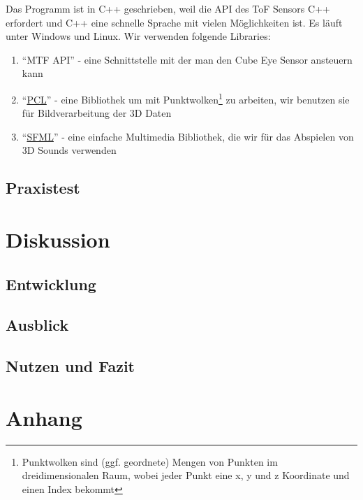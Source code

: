 \documentclass[a4paper,12pt,ngerman]{scrartcl}
\begin{document}
Das Programm ist in C++ geschrieben, weil die API des ToF Sensors C++ erfordert und C++ eine schnelle
Sprache mit vielen Möglichkeiten ist. Es läuft unter Windows und Linux. Wir verwenden folgende Libraries:
\begin{enumerate}
\item \enquote{MTF API} - eine Schnittstelle mit der man den Cube Eye Sensor ansteuern kann
\item \enquote{\href{http://pointclouds.org/}{PCL}} - eine Bibliothek um mit Punktwolken\footnote{Punktwolken sind (ggf. geordnete) Mengen von Punkten im dreidimensionalen Raum, 
wobei jeder Punkt eine x, y und z Koordinate und einen Index bekommt} zu arbeiten, wir benutzen 
sie für Bildverarbeitung der 3D Daten
\item \enquote{\href{https://www.sfml-dev.org/}{SFML}} - eine einfache Multimedia Bibliothek, 
die wir für das Abspielen von 3D Sounds verwenden 
\end{enumerate} 


\subsection{Praxistest}

\newpage

\section{Diskussion}

\subsection{Entwicklung}

\subsection{Ausblick}

\subsection{Nutzen und Fazit}

\newpage

\section{Anhang}
\end{document}
